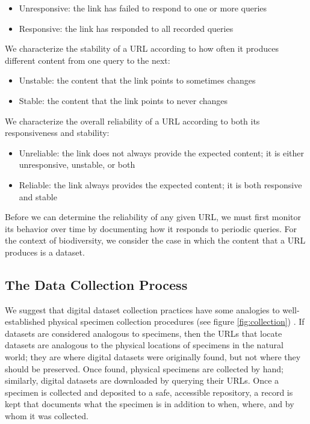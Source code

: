 \begin{itemize}
 \item Unresponsive: the link has failed to respond to one or more queries
 \item Responsive: the link has responded to all recorded queries
\end{itemize}

We characterize the stability of a URL according to how often it produces different content from one query to the next:

\begin{itemize}
 \item Unstable: the content that the link points to sometimes changes
 \item Stable: the content that the link points to never changes
\end{itemize}

We characterize the overall reliability of a URL according to both its responsiveness and stability:

\begin{itemize}
 \item Unreliable: the link does not always provide the expected content; it is either unresponsive, unstable, or both
 \item Reliable: the link always provides the expected content; it is both responsive and stable
\end{itemize}

Before we can determine the reliability of any given URL, we must first monitor its behavior over time by documenting how it responds to periodic queries. For the context of biodiversity, we consider the case in which the content that a URL produces is a dataset.

\subsection*{The Data Collection Process}
We suggest that digital dataset collection practices have some analogies to well-established physical specimen collection procedures (see figure \ref{fig:collection}) \citep{Poelen_2019}. If datasets are considered analogous to specimens, then the URLs that locate datasets are analogous to the physical locations of specimens in the natural world; they are where digital datasets were originally found, but not where they should be preserved. Once found, physical specimens are collected by hand; similarly, digital datasets are downloaded by querying their URLs. Once a specimen is collected and deposited to a safe, accessible repository, a record is kept that documents what the specimen is in addition to when, where, and by whom it was collected.

